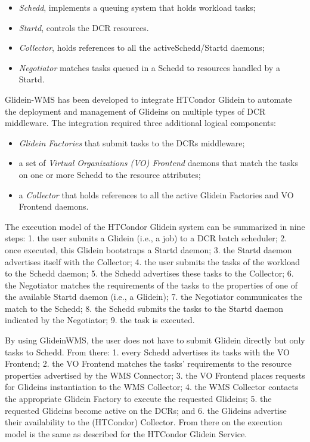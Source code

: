 \begin{itemize}
    \item \emph{Schedd}, implements a queuing system that holds workload tasks;
    \item \emph{Startd}, controls the DCR resources.
    \item \emph{Collector}, holds references to all the activeSchedd/Startd daemons;
    \item \emph{Negotiator} matches tasks queued in a Schedd to resources handled by a Startd.
\end{itemize}

Glidein-WMS has been developed to integrate HTCondor Glidein to  automate the
deployment and management of Glideins on multiple types of DCR middleware. The
integration required three additional logical components:

\begin{itemize}
    \item \emph{Glidein Factories} that submit tasks to the DCRs middleware;
    \item a set of \emph{Virtual Organizations (VO) Frontend} daemons that
    match the tasks on one or more Schedd to the resource attributes;
    \item a \emph{Collector} that holds references to all the active Glidein
    Factories and VO Frontend daemons.
\end{itemize}

The execution model of the HTCondor Glidein system can be summarized in nine
steps: 1. the user submits a Glidein (i.e., a job) to a DCR batch scheduler; 2.
once executed, this Glidein bootstraps a Startd daemon; 3. the Startd daemon
advertises itself with the Collector; 4. the user submits the tasks of the
workload to the Schedd daemon; 5. the Schedd advertises these tasks to the
Collector; 6. the Negotiator matches the requirements of the tasks to the
properties of one of the available Startd daemon (i.e., a Glidein); 7. the
Negotiator communicates the match to the Schedd; 8. the Schedd submits the tasks
to the Startd daemon indicated by the Negotiator; 9. the task is executed.

By using GlideinWMS, the user does not have to submit Glidein directly but only
tasks to Schedd. From there: 1. every Schedd advertises its tasks with the VO
Frontend; 2. the VO Frontend matches the tasks’ requirements to the resource
properties advertised by the WMS Connector; 3. the VO Frontend places requests
for Glideins instantiation to the WMS Collector; 4. the WMS Collector contacts
the appropriate Glidein Factory to execute the requested Glideins; 5. the
requested Glideins become active on the DCRs; and 6. the Glideins advertise
their availability to the (HTCondor) Collector. From there on the execution
model is the same as described for the HTCondor Glidein Service.

